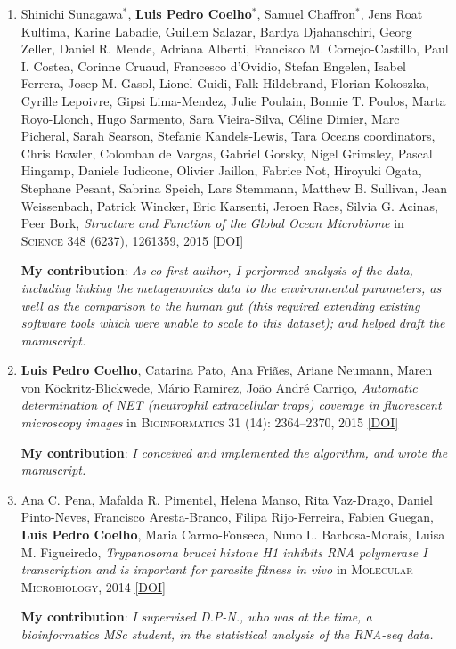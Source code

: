 \documentclass{article}
\newcommand\showdoi[1]{%
    \href{http://dx.doi.org/#1}{[DOI]}%
}
\newcommand\pubname[1]{\textsc{#1}}
\newcommand\contribution[1]{\relax\hfill\break\textbf{My contribution}: \textit{#1}}
\begin{document}
\begin{enumerate}[resume]
\item Shinichi Sunagawa${}^{*}$, \textbf{Luis Pedro Coelho}${}^{*}$, Samuel
Chaffron${}^{*}$, Jens Roat Kultima, Karine Labadie, Guillem Salazar, Bardya
Djahanschiri, Georg Zeller, Daniel R. Mende, Adriana Alberti, Francisco M.
Cornejo-Castillo, Paul I. Costea, Corinne Cruaud, Francesco d'Ovidio, Stefan
Engelen, Isabel Ferrera, Josep M. Gasol, Lionel Guidi, Falk Hildebrand, Florian
Kokoszka, Cyrille Lepoivre, Gipsi Lima-Mendez, Julie Poulain, Bonnie T. Poulos,
Marta Royo-Llonch, Hugo Sarmento, Sara Vieira-Silva, Céline Dimier, Marc
Picheral, Sarah Searson, Stefanie Kandels-Lewis, Tara Oceans coordinators,
Chris Bowler, Colomban de Vargas, Gabriel Gorsky, Nigel Grimsley, Pascal
Hingamp, Daniele Iudicone, Olivier Jaillon, Fabrice Not, Hiroyuki Ogata,
Stephane Pesant, Sabrina Speich, Lars Stemmann, Matthew B. Sullivan, Jean
Weissenbach, Patrick Wincker, Eric Karsenti, Jeroen Raes, Silvia G. Acinas,
Peer Bork, \emph{Structure and Function of the Global Ocean Microbiome} in
\pubname{Science} 348 (6237), 1261359, 2015 \showdoi{10.1126/science.1261359}
\contribution{As co-first author, I performed analysis of the data, including
linking the metagenomics data to the environmental parameters, as well as the
comparison to the human gut (this required extending existing software tools
which were unable to scale to this dataset); and helped draft the manuscript.}

\item \textbf{Luis Pedro Coelho}, Catarina Pato, Ana Friães, Ariane Neumann,
Maren von Köckritz-Blickwede, Mário Ramirez, João André Carriço,
\emph{Automatic determination of NET (neutrophil extracellular traps) coverage
in fluorescent microscopy images} in \pubname{Bioinformatics} 31 (14):
2364--2370, 2015 \showdoi{10.1093/bioinformatics/btv156}
\contribution{I conceived and implemented the algorithm, and wrote the
manuscript.}

\item Ana C. Pena, Mafalda R. Pimentel, Helena Manso, Rita Vaz-Drago, Daniel
Pinto-Neves, Francisco Aresta-Branco, Filipa Rijo-Ferreira, Fabien Guegan,
\textbf{Luis Pedro Coelho}, Maria Carmo-Fonseca, Nuno L. Barbosa-Morais, Luisa
M. Figueiredo, \emph{Trypanosoma brucei histone H1 inhibits RNA polymerase I
transcription and is important for parasite fitness in vivo} in
\pubname{Molecular Microbiology}, 2014 \showdoi{10.1111/mmi.12677}
\contribution{I supervised D.P-N., who was at the time, a bioinformatics MSc
student, in the statistical analysis of the RNA-seq data.}


\end{enumerate}
\end{document}
